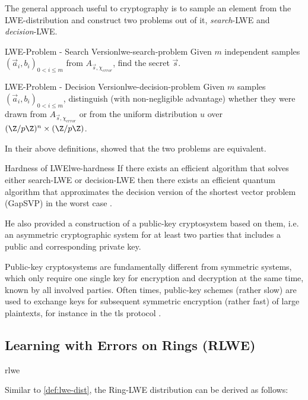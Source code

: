 The general approach useful to cryptography is to sample an element from the LWE-distribution and construct
two problems out of it, \textit{search}-LWE and \textit{decision}-LWE.

\begin{definition}{LWE-Problem - Search Version}{lwe-search-problem}
  Given $m$ independent samples $(\vec{a}_i, b_i)_{0 < i \leq m}$ from $A_{\vec{s}, \chi_{error}}$, find the secret $\vec{s}$.
\end{definition}
\begin{definition}{LWE-Problem - Decision Version}{lwe-decision-problem}
  Given $m$ samples $(\vec{a}_i, b_i)_{0 < i \leq m}$, distinguish (with non-negligible advantage) whether they were drawn from $A_{\vec{s}, \chi_{error}}$ or from the uniform distribution $u$ over $(\Z / p \Z)^n \times (\Z / p \Z)$.
\end{definition}

In their above definitions, \citeauthor{2005-lwe-original} showed that the two problems are equivalent.

\begin{theorem}{Hardness of LWE}{lwe-hardness}
  If there exists an efficient algorithm that solves either search-LWE or decision-LWE then there exists an efficient quantum algorithm that approximates the decision version of the shortest vector problem (GapSVP) in the worst case \parencite{2010-lwe-survey}.
\end{theorem}

He also provided a construction of a public-key cryptosystem based on them, i.e. an asymmetric cryptographic system for at least two parties that includes a public and corresponding private key.

Public-key cryptosystems are fundamentally different from symmetric systems, which only require one single key for encryption and decryption at the same time, known by all involved parties.
Often times, public-key schemes (rather slow) are used to exchange keys for subsequent symmetric encryption (rather fast) of large plaintexts, for instance in the \gls{tls} protocol \parencite{rfc8446}.

\subsection{Learning with Errors on Rings (RLWE)}
\Gls{rlwe}
\cite{2010-rlwe-original}

Similar to \autoref{def:lwe-dist}, the Ring-LWE distribution can be derived as follows:

